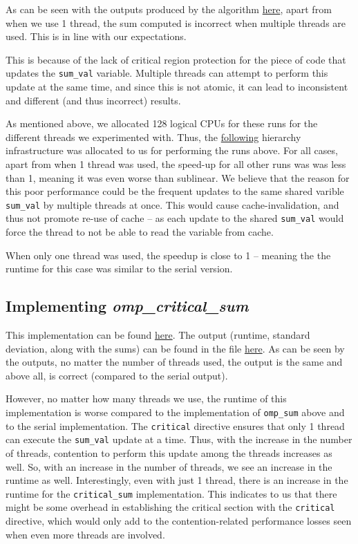 \documentclass[a4paper,10pt]{article}
\begin{document}
As can be seen with the outputs produced by the algorithm \href{https://github.com/paulmyr/DD2356-MethodsHPC/blob/master/3_open_mp/exercise3/outputs/omp_output.txt}{here}, apart from when we use 1 thread, the sum computed is incorrect when multiple threads are used. This is in line with our expectations. 

This is because of the lack of critical region protection for the piece of code that updates the \verb|sum_val| variable. Multiple threads can attempt to perform this update at the same time, and since this is not atomic, it can lead to inconsistent and different (and thus incorrect) results.  

As mentioned above, we allocated 128 logical CPUs for these runs for the different threads we experimented with. Thus, the \href{https://github.com/paulmyr/DD2356-MethodsHPC/blob/master/3_open_mp/img/ex3/ex3_topology_omp_sum.svg}{following} hierarchy infrastructure was allocated to us for performing the runs above. For all cases, apart from when 1 thread was used, the speed-up for all other runs was was less than 1, meaning it was even worse than sublinear. We believe that the reason for this poor performance could be the frequent updates to the same shared varible \verb|sum_val| by multiple threads at once. This would cause cache-invalidation, and thus not promote re-use of cache -- as each update to the shared \verb|sum_val| would force the thread to not be able to read the variable from cache. 

When only one thread was used, the speedup is close to 1 -- meaning the the runtime for this case was similar to the serial version. 

\subsection{Implementing \textit{omp\_critical\_sum}}
This implementation can be found \href{https://github.com/paulmyr/DD2356-MethodsHPC/blob/master/3_open_mp/exercise3/omp_critical_sum.c}{here}. The output (runtime, standard deviation, along with the sums) can be found in the file \href{https://github.com/paulmyr/DD2356-MethodsHPC/blob/master/3_open_mp/exercise3/outputs/omp_critical_output.txt}{here}. As can be seen by the outputs, no matter the number of threads used, the output is the same and above all, is correct (compared to the serial output). 

However, no matter how many threads we use, the runtime of this implementation is worse compared to the implementation of \verb|omp_sum| above and to the serial implementation. The \verb|critical| directive ensures that only 1 thread can execute the \verb|sum_val| update at a time. Thus, with the increase in the number of threads, contention to perform this update among the threads increases as well. So, with an increase in the number of threads, we see an increase in the runtime as well. Interestingly, even with just 1 thread, there is an increase in the runtime for the \verb|critical_sum| implementation. This indicates to us that there might be some overhead in establishing the critical section with the \verb|critical| directive, which would only add to the contention-related performance losses seen when even more threads are involved.
\end{document}
